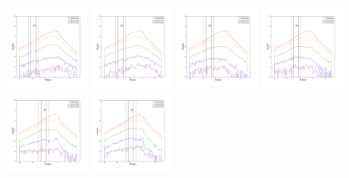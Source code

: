 \documentclass[12pt,prd]{article}
\begin{document}
\begin{figure}[h!]
\includegraphics[width=0.24\textwidth]{../figures/scanning_plotsgaiascan_l67_5_b74_4_ra208_6_dec35_1_npy_3.pdf}
\includegraphics[width=0.24\textwidth]{../figures/scanning_plotsgaiascan_l67_5_b74_4_ra208_6_dec35_1_npy_4.pdf}
\includegraphics[width=0.24\textwidth]{../figures/scanning_plotsgaiascan_l67_5_b74_4_ra208_6_dec35_1_npy_5.pdf}
\includegraphics[width=0.24\textwidth]{../figures/scanning_plotsgaiascan_l67_5_b74_4_ra208_6_dec35_1_npy_6.pdf}
\includegraphics[width=0.24\textwidth]{../figures/scanning_plotsgaiascan_l67_5_b74_4_ra208_6_dec35_1_npy_7.pdf}
\includegraphics[width=0.24\textwidth]{../figures/scanning_plotsgaiascan_l67_5_b74_4_ra208_6_dec35_1_npy_8.pdf}

\end{figure}
\end{document}
